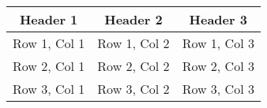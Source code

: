 \documentclass{article}
\begin{document}
\begin{tabular}{|c|c|c|}
  \hline
  \textbf{Header 1} & \textbf{Header 2} & \textbf{Header 3} \\
  \hline
  Row 1, Col 1 & Row 1, Col 2 & Row 1, Col 3 \\
  \hline
  Row 2, Col 1 & Row 2, Col 2 & Row 2, Col 3 \\
  \hline
  Row 3, Col 1 & Row 3, Col 2 & Row 3, Col 3 \\
  \hline
\end{tabular}
\end{document}
